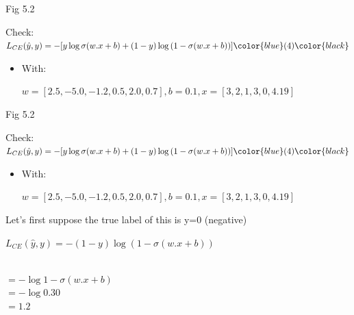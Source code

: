 \documentclass[13.5pt,aspecratio=169]{beamer}
\begin{document}
\begin{frame}{Fig 5.2}
    \begin{exampleblock}{Check:}
        $L_{CE} (\hat{y},y) = - [y \log{\sigma(w.x+b) }+(1-y)\log{(1-\sigma(w.x+b))}]\color{blue} (4) \color{black}$ 
        \begin{itemize}

            \item  With:
            \centerline{$ w = [2.5,−5.0,−1.2,0.5,2.0,0.7], b = 0.1, x = [3,2,1,3,0,4.19]$}
        \end{itemize}
    \end{exampleblock}
\end{frame}
\begin{frame}{Fig 5.2}
    \begin{exampleblock}{Check:}
        $L_{CE} (\hat{y},y) = - [y \log{\sigma(w.x+b) }+(1-y)\log{(1-\sigma(w.x+b))}]\color{blue} (4) \color{black}$ 
        \begin{itemize}
            \item  With:
            \centerline{$ w = [2.5,−5.0,−1.2,0.5,2.0,0.7], b = 0.1, x = [3,2,1,3,0,4.19]$}
        \end{itemize}
    \end{exampleblock}
    \begin{exampleblock}{Let's first suppose the true label of this is y=0 (negative)}
        \centerline{$L_{CE} (\hat{y},y) =  - (1-y)\log{(1-\sigma(w.x+b)) }$}
        \\
        \hspace{102}$= - \log{1-\sigma(w.x+b)}$
        \\
        \hspace{102}$= - \log{0.30}$
        \\
        \hspace{102}$= 1.2$
    \end{exampleblock}
\end{frame}
\end{document}
